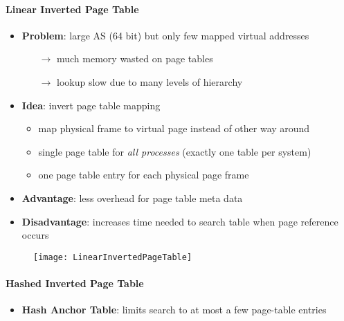 \paragraph{Linear Inverted Page Table}
\begin{itemize}
  \item \textbf{Problem}: large AS (64 bit) but only few mapped virtual addresses
  \begin{itemize}
    \item[$ \to $] much memory wasted on page tables
    \item[$ \to $] lookup slow due to many levels of hierarchy
  \end{itemize}
  \item \textbf{Idea}: invert page table mapping
  \begin{itemize}
    \item map physical frame to virtual page instead of other way around
    \item single page table for \emph{all processes} (exactly one table per system)
    \item one page table entry for each physical page frame
  \end{itemize}
  \item \textbf{Advantage}: less overhead for page table meta data
  \item \textbf{Disadvantage}: increases time needed to search table when page reference occurs
\end{itemize}
\begin{figure}[h]\centering\label{LinearInvertedPageTable}\texttt{[image: LinearInvertedPageTable]}\end{figure}

\paragraph{Hashed Inverted Page Table}
\begin{itemize}
  \item \textbf{Hash Anchor Table}: limits search to at most a few page-table entries
\end{itemize}

